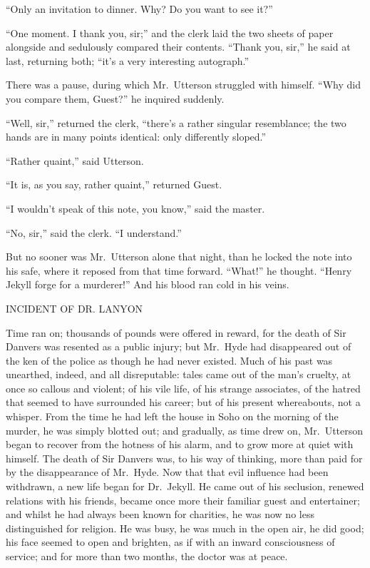 \documentclass[12pt,openright]{book}
\begin{document}
“Only an invitation to dinner. Why? Do you want to see it?”

“One moment. I thank you, sir;” and the clerk laid the two sheets of paper alongside and sedulously compared their contents. “Thank you, sir,” he said at last, returning both; “it’s a very interesting autograph.”

There was a pause, during which Mr. Utterson struggled with himself. “Why did you compare them, Guest?” he inquired suddenly.

“Well, sir,” returned the clerk, “there’s a rather singular resemblance; the two hands are in many points identical: only differently sloped.”

“Rather quaint,” said Utterson.

“It is, as you say, rather quaint,” returned Guest.

“I wouldn’t speak of this note, you know,” said the master.

“No, sir,” said the clerk. “I understand.”

But no sooner was Mr. Utterson alone that night, than he locked the note into his safe, where it reposed from that time forward. “What!” he thought. “Henry Jekyll forge for a murderer!” And his blood ran cold in his veins.

INCIDENT OF DR. LANYON

Time ran on; thousands of pounds were offered in reward, for the death of Sir Danvers was resented as a public injury; but Mr. Hyde had disappeared out of the ken of the police as though he had never existed. Much of his past was unearthed, indeed, and all disreputable: tales came out of the man’s cruelty, at once so callous and violent; of his vile life, of his strange associates, of the hatred that seemed to have surrounded his career; but of his present whereabouts, not a whisper. From the time he had left the house in Soho on the morning of the murder, he was simply blotted out; and gradually, as time drew on, Mr. Utterson began to recover from the hotness of his alarm, and to grow more at quiet with himself. The death of Sir Danvers was, to his way of thinking, more than paid for by the disappearance of Mr. Hyde. Now that that evil influence had been withdrawn, a new life began for Dr. Jekyll. He came out of his seclusion, renewed relations with his friends, became once more their familiar guest and entertainer; and whilst he had always been known for charities, he was now no less distinguished for religion. He was busy, he was much in the open air, he did good; his face seemed to open and brighten, as if with an inward consciousness of service; and for more than two months, the doctor was at peace.
\end{document}
